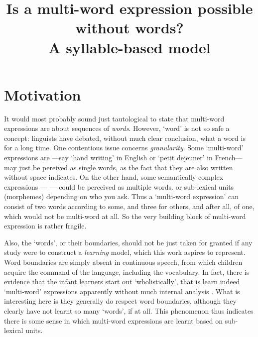 \documentclass{article}
\begin{document}
\title{Is a multi-word expression possible without words? \\A syllable-based model}

\maketitle

\section{Motivation}

It would most probably sound just tautological to state that multi-word expressions are about sequences of \emph{words}. However, `word' is not so safe a concept: linguists have debated, without much clear conclusion, what a word is for a long time. One contentious issue concerns \emph{granularity}. Some `multi-word' expressions are ---say `hand writing' in English or `petit dejeuner' in French--- may just be pereived as single words, as the fact that they are also written without space indicates. On the other hand, some semantically complex expressions --- --- could be perceived as multiple words.  or sub-lexical units (morphemes) depending on who you ask. Thus a `multi-word expression' can consist of two words according to some, and three for others, and after all, of one, which would not be multi-word at all. So the very building block of multi-word expression is rather fragile. 

Also, the `words', or their boundaries, should not be just taken for granted if any study were to construct a \emph{learning} model, which this work aspires to represent. Word boundaries are simply absent in continuous speech, from which children acquire the command of the language, including the vocabulary. In fact, there is evidence that the infant learners start out `wholistically', that is learn indeed `multi-word' expressions apparently without much internal analysis \cite{}. What is interesting here is they generally do respect word boundaries, although they clearly have not learnt so many `words', if at all. This phenomenon thus indicates there is some sense in which multi-word expressions are learnt based on sub-lexical units.
\end{document}
